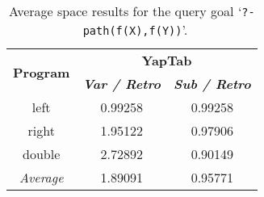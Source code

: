 \begin{table}[ht]
\centering
  \begin{tabular}{ccc}
   \hline
    \hline
    \multirow{2}{*}{\textbf{Program}} & \multicolumn{2}{c}{\textbf{YapTab}} \\
    & \textbf{\textit{\small{Var / Retro}}} & \textbf{\textit{\small{Sub / Retro}}} \\
   \hline
   \hline
   left & 0.99258 & 0.99258 \\
   right & 1.95122 & 0.97906 \\
double & 2.72892 & 0.90149 \\
\hline
\hline
\textit{Average} & 1.89091 &  0.95771 \\
\hline
\hline
\end{tabular}
\caption{Average space results for the query goal `\texttt{?-~path(f(X),f(Y))}'.}
\label{tbl:results_average_stst_space}
\end{table}

